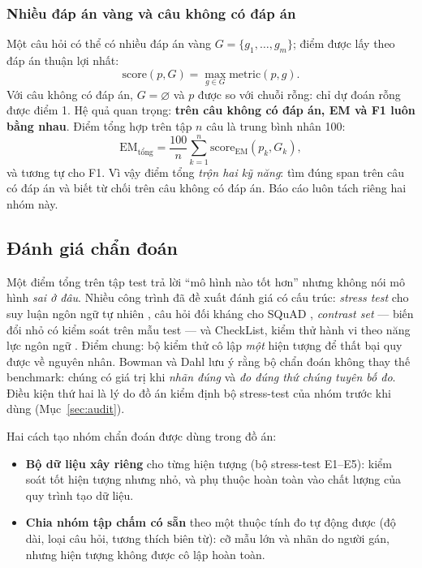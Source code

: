 \subsubsection{Nhiều đáp án vàng và câu không có đáp án}

Một câu hỏi có thể có nhiều đáp án vàng $G = \{g_1, \dots, g_m\}$; điểm được lấy theo đáp
án thuận lợi nhất:
\begin{equation}
  \mathrm{score}(p, G) = \max_{g \in G} \mathrm{metric}(p, g).
\end{equation}
Với câu không có đáp án, $G = \varnothing$ và $p$ được so với chuỗi rỗng: chỉ dự đoán rỗng
được điểm 1. Hệ quả quan trọng: \textbf{trên câu không có đáp án, EM và F1 luôn bằng
nhau}. Điểm tổng hợp trên tập $n$ câu là trung bình nhân 100:
\begin{equation}
  \mathrm{EM}_{\text{tổng}} = \frac{100}{n} \sum_{k=1}^{n} \mathrm{score}_{\mathrm{EM}}(p_k, G_k),
\end{equation}
và tương tự cho F1. Vì vậy điểm tổng \emph{trộn hai kỹ năng}: tìm đúng span trên câu có
đáp án và biết từ chối trên câu không có đáp án. Báo cáo luôn tách riêng hai nhóm này.

\subsection{Đánh giá chẩn đoán}
\label{sec:diag-theory}

Một điểm tổng trên tập test trả lời ``mô hình nào tốt hơn'' nhưng không nói mô hình \emph{sai ở
đâu}. Nhiều công trình đã đề xuất đánh giá có cấu trúc: \emph{stress test} cho suy luận ngôn
ngữ tự nhiên \cite{naik2018stress}, câu hỏi đối kháng cho SQuAD \cite{jia2017adversarial},
\emph{contrast set} --- biến đổi nhỏ có kiểm soát trên mẫu test \cite{gardner2020contrast} --- và
CheckList, kiểm thử hành vi theo năng lực ngôn ngữ \cite{ribeiro2020checklist}. Điểm chung: bộ
kiểm thử cô lập \emph{một} hiện tượng để thất bại quy được về nguyên nhân. Bowman và Dahl
\cite{bowman2021fix} lưu ý rằng bộ chẩn đoán không thay thế benchmark: chúng có giá trị khi
\emph{nhãn đúng} và \emph{đo đúng thứ chúng tuyên bố đo}. Điều kiện thứ hai là lý do đồ án kiểm
định bộ stress-test của nhóm trước khi dùng (Mục~\ref{sec:audit}).

Hai cách tạo nhóm chẩn đoán được dùng trong đồ án:
\begin{itemize}
  \item \textbf{Bộ dữ liệu xây riêng} cho từng hiện tượng (bộ stress-test E1--E5): kiểm soát tốt
        hiện tượng nhưng nhỏ, và phụ thuộc hoàn toàn vào chất lượng của quy trình tạo dữ liệu.
  \item \textbf{Chia nhóm tập chấm có sẵn} theo một thuộc tính đo tự động được (độ dài, loại
        câu hỏi, tương thích biên từ): cỡ mẫu lớn và nhãn do người gán, nhưng hiện tượng không
        được cô lập hoàn toàn.
\end{itemize}

